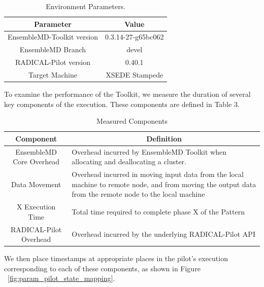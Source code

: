 \documentclass[]{article}
\begin{document}
		\begin{table}[H]
			\centering
			\begin{tabular}{|c|c|}
					\hline
					Parameter & Value \\
					\hline
					\hline
					EnsembleMD-Toolkit version & 0.3.14-27-g65bc062 \\
					\hline
					EnsembleMD Branch & devel \\
					\hline
					RADICAL-Pilot version & 0.40.1 \\
					\hline
					Target Machine & XSEDE Stampede \\
					\hline
			\end{tabular}
			\caption{Environment Parameters.}
			\label{table:environment_variables}
		\end{table}

		To examine the performance of the Toolkit, we measure the duration of several key components of the execution. These components are defined in Table 3.

		\begin{table}[H]
			\centering
			\begin{tabular}{|c|p{10cm}|}
					\hline
					Component & \multicolumn{1}{|c|}{Definition} \\
					\hline
					\hline
					EnsembleMD Core Overhead & Overhead incurred by EnsembleMD Toolkit when allocating and deallocating a cluster. \\
					\hline
					Data Movement &  Overhead incurred in moving input data from the local machine to remote node, and from moving the output data from the remote node to the local machine\\
					\hline
					X Execution Time & Total time required to complete phase X of the Pattern\\
					\hline
					RADICAL-Pilot Overhead & Overhead incurred by the underlying RADICAL-Pilot API \\
					\hline
			\end{tabular}
			\caption{Measured Components}
			\label{table:measured_components}
		\end{table}

		We then place timestamps at appropriate places in the pilot's execution corresponding to each of these components, as shown in Figure ~\ref{fig:param_pilot_state_mapping}.
\end{document}
